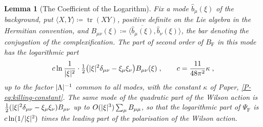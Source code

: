 \documentclass[11pt]{preprint}
\newcommand{\tr}{\operatorname{tr}}
\DeclarePairedDelimiter{\abs}{\lvert}{\rvert}
\numberwithin{equation}{section}
\newtheorem{lemma}{Lemma}[section]
\theoremstyle{definition}
\theoremstyle{remark}
\theoremstyle{plain}
\begin{document}
\begin{lemma}[The Coefficient of the Logarithm]\label{lem:angular-coefficient}
Fix a mode $\hat b_\mu(\xi)$ of the background, put $\langle X, Y \rangle \coloneqq \tr(XY)$, positive definite on the Lie algebra in the Hermitian convention, and $B_{\mu\nu}(\xi) \coloneqq \langle\overline{\hat b_\mu(\xi)}, \hat b_\nu(\xi)\rangle$, the bar denoting the conjugation of the complexification. The part of second order of $B_{\mathrm F}$ in this mode has the logarithmic part
\begin{equation}\label{eq:angular-coefficient}
    c\ln\frac{1}{\abs{\xi}^2}\cdot\tfrac12\bigl(\abs{\xi}^2\delta_{\mu\nu} - \xi_\mu\xi_\nu\bigr)B_{\mu\nu}(\xi)\;,
    \qquad
    c = \frac{11}{48\pi^2}\kappa\;,
\end{equation}
up to the factor $\abs{\Lambda}^{-1}$ common to all modes, with the constant $\kappa$ of Paper, \eqref{P-eq:killing-constant}. The same mode of the quadratic part of the Wilson action is $\frac12(\abs{\xi}^2\delta_{\mu\nu} - \xi_\mu\xi_\nu)B_{\mu\nu}$ up to $O(\abs{\xi}^3)\sum_\mu B_{\mu\mu}$, so that the logarithmic part of $\Psi_{\mathrm F}$ is $c\ln(1/\abs{\xi}^2)$ times the leading part of the polarisation of the Wilson action.
\end{lemma}
\end{document}
